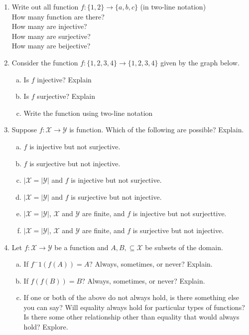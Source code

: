 \documentclass[11pt, a4paper]{article}
\newcommand\setItemNumber[1]{\setcounter{enumi}{\numexpr#1-1\relax}}
\begin{document}
\begin{enumerate}
        \setItemNumber{6}
    \item Write out all function $f : \{1,2\}\rightarrow \{a,b,c\}$ (in two-line notation)\\
        How many function are there?\\
        How many are injective?\\
        How many are surjective?\\
        How many are beijective?\\

    \setItemNumber{8}
    \item Consider the function $f : \{1,2,3,4\}\rightarrow \{1,2,3,4\}$ given by the graph below.
        \begin{enumerate}[(a)]
            \item Is $f$ injective? Explain
            \item Is $f$ surjective? Explain
            \item Write the function using two-line notation
        \end{enumerate}


    \setItemNumber{19}
\item Suppose $f : \mathcal{X} \rightarrow \mathcal{Y}$ is function. Which of the following are possible? Explain.
        \begin{enumerate}[(a)]
            \item $f$ is injective but not surjective.
            \item $f$ is surjective but not injective.
            \item $|\mathcal{X} = |\mathcal{Y}|$ and $f$ is injective but not surjective.
            \item $|\mathcal{X} = |\mathcal{Y}|$ and $f$ is surjective but not injective.
            \item $|\mathcal{X} = |\mathcal{Y}|$, $\mathcal{X}$ and $\mathcal{Y}$ are finite, and $f$ is injective but not surjecttive.             
            \item $|\mathcal{X} = |\mathcal{Y}|$, $\mathcal{X}$ and $\mathcal{Y}$ are finite, and $f$ is surjective but not injective.
        \end{enumerate}

    \setItemNumber{28}
    \item Let $f: \mathcal{X}\rightarrow\mathcal{Y}$ be a function and $A,B,\subseteq\mathcal{X}$ be subsets of the domain.
        \begin{enumerate}[(a)]
            \item If $f^-1(f(A)) = A$? Always, sometimes, or never? Explain.
            \item If $f(f(B)) = B$? Always, sometimes, or never? Explain.
            \item If one or both of the above do not always hold, is there something else you can say? Will equality always hold for particular types of functions? Is there some other relationship other than equality that would always hold? Explore.
        \end{enumerate}

    \end{enumerate}
\end{document}
